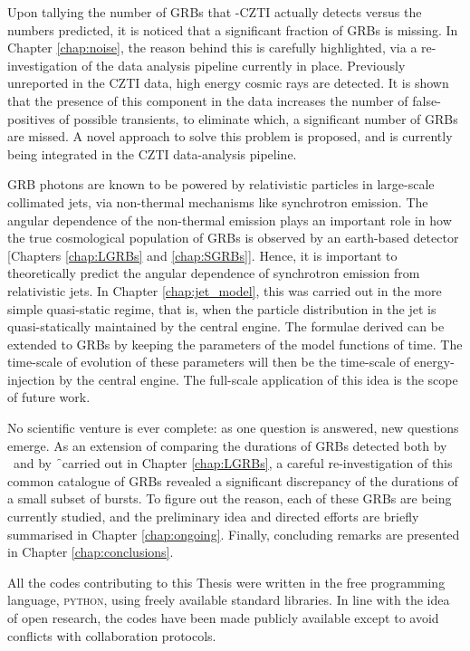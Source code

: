 Upon tallying the number of GRBs that \AS -CZTI actually detects versus the numbers predicted, it is noticed that a significant fraction of GRBs is missing. In Chapter \ref{chap:noise}, the reason behind this is carefully highlighted, via a re-investigation of the data analysis pipeline currently in place. Previously unreported in the CZTI data, high energy cosmic rays are detected. It is shown that the presence of this component in the data increases the number of false-positives of possible transients, to eliminate which, a significant number of GRBs are missed. A novel approach to solve this problem is proposed, and is currently being integrated in the CZTI data-analysis pipeline.

GRB photons are known to be powered by relativistic particles in large-scale collimated jets, via non-thermal mechanisms like synchrotron emission. The angular dependence of the non-thermal emission plays an important role in how the true cosmological population of GRBs is observed by an earth-based detector [Chapters \ref{chap:LGRBs} and \ref{chap:SGRBs}]. Hence, it is important to theoretically predict the angular dependence of synchrotron emission from relativistic jets. In Chapter \ref{chap:jet_model}, this was carried out in the more simple quasi-static regime, that is, when the particle distribution in the jet is quasi-statically maintained by the central engine. The formulae derived can be extended to GRBs by keeping the parameters of the model functions of time. The time-scale of evolution of these parameters will then be the time-scale of energy-injection by the central engine. The full-scale application of this idea is the scope of future work.

No scientific venture is ever complete: as one question is answered, new questions emerge. As an extension of comparing the durations of GRBs detected both by \s\ and by \f\ carried out in Chapter \ref{chap:LGRBs}, a careful re-investigation of this common catalogue of GRBs revealed a significant discrepancy of the durations of a small subset of bursts. To figure out the reason, each of these GRBs are being currently studied, and the preliminary idea and directed efforts are briefly summarised in Chapter \ref{chap:ongoing}. Finally, concluding remarks are presented in Chapter \ref{chap:conclusions}.

All the codes contributing to this Thesis were written in the free programming language, \textsc{python}, using freely available standard libraries. In line with the idea of open research, the codes have been made publicly available except to avoid conflicts with collaboration protocols.